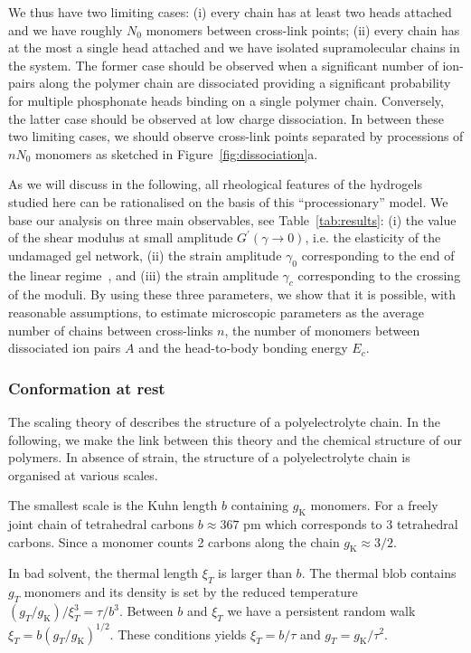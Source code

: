 \documentclass[journal=jacsat,manuscript=article]{achemso}
\begin{document}
We thus have two limiting cases: (i) every chain has at least two heads attached and we have roughly $N_0$ monomers between cross-link points; (ii) every chain has at the most a single head attached and we have isolated supramolecular chains in the system. The former case should be observed when a significant number of ion-pairs along the polymer chain are dissociated providing a significant probability for multiple phosphonate heads binding on a single polymer chain. Conversely, the latter case should be observed at low charge dissociation. In between these two limiting cases, we should observe cross-link points separated by processions of $n N_0$ monomers as sketched in Figure~\ref{fig:dissociation}a.

As we will discuss in the following, all rheological features of the hydrogels studied here can  be rationalised on the basis of this ``processionary'' model. We base our analysis on three main observables, see Table~\ref{tab:results}: (i) the value of the shear modulus at small amplitude $G^\prime(\gamma\rightarrow 0)$, i.e. the elasticity of the undamaged gel network, (ii) the strain amplitude $\gamma_0$ corresponding to the end of the linear regime~\cite{Hyun2011}, and (iii) the strain amplitude $\gamma_c$ corresponding to the crossing of the moduli. By using these three parameters, we show that it is possible, with reasonable assumptions, to estimate microscopic parameters as the average number of chains between cross-links $n$, the number of monomers between dissociated ion pairs $A$ and the head-to-body bonding energy $E_c$.


\subsubsection{Conformation at rest}

The scaling theory of \citet{Rubinstein1996} describes the structure of a polyelectrolyte chain. In the following, we make the link between this theory and the chemical structure of our polymers. In absence of strain, the structure of a polyelectrolyte chain is organised at various scales.

The smallest scale is the Kuhn length $b$ containing $g_\mathrm{K}$ monomers. For a freely joint chain of tetrahedral carbons $b\approx 367$ pm which corresponds to 3 tetrahedral carbons. Since a monomer counts 2 carbons along the chain $g_\mathrm{K}\approx 3/2$.

In bad solvent, the thermal length $\xi_T$ is larger than $b$. The thermal blob contains $g_T$ monomers and its density is set by the reduced temperature $(g_T/g_\mathrm{K})/\xi_T^3 = \tau/b^3$. Between $b$ and $\xi_T$ we have a persistent random walk $\xi_T = b (g_T/g_\mathrm{K})^{1/2}$. These conditions yields $\xi_T = b/\tau$ and $g_T = g_\mathrm{K}/\tau^2$.
\end{document}
